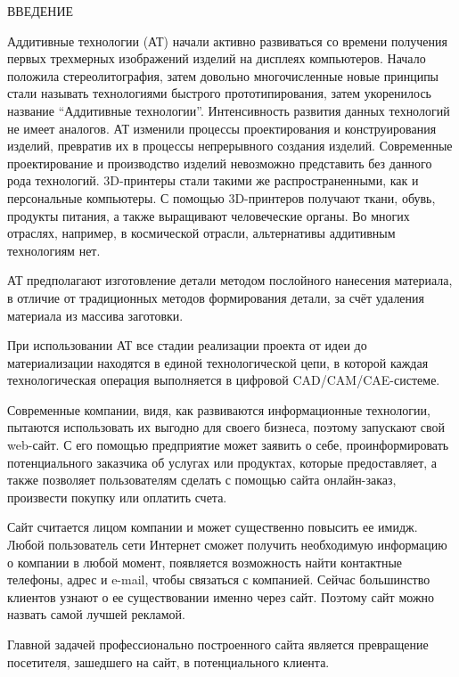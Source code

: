 \newpage
\begin{center}ВВЕДЕНИЕ\end{center}


Аддитивные технологии (АТ) начали активно развиваться со времени получения первых трехмерных изображений изделий на дисплеях компьютеров. Начало положила стереолитография, затем довольно многочисленные новые принципы стали называть технологиями быстрого прототипирования, затем укоренилось название ``Аддитивные технологии''. Интенсивность развития данных технологий не имеет аналогов. АТ изменили процессы проектирования и конструирования изделий, превратив их в процессы непрерывного создания изделий. Современные проектирование и производство изделий невозможно представить без данного рода технологий. 3D-принтеры стали такими же распространенными, как и персональные компьютеры. С помощью 3D-принтеров получают ткани, обувь, продукты питания, а также выращивают человеческие органы. Во многих отраслях, например, в космической отрасли, альтернативы аддитивным технологиям нет.

АТ предполагают изготовление детали методом послойного нанесения материала, в отличие от традиционных методов формирования детали, за счёт удаления материала из массива заготовки.

При использовании АТ все стадии реализации проекта от идеи до материализации находятся в единой технологической цепи, в которой каждая технологическая операция выполняется в цифровой CAD/CAM/CAE-системе.

Современные компании, видя, как развиваются информационные технологии, пытаются использовать их выгодно для своего бизнеса, поэтому запускают свой web-сайт. С его помощью предприятие может заявить о себе, проинформировать потенциального заказчика об услугах или продуктах, которые предоставляет, а также позволяет пользователям сделать с помощью сайта онлайн-заказ, произвести покупку или оплатить счета.

Сайт считается лицом компании и может существенно повысить ее имидж. Любой пользователь сети Интернет сможет получить необходимую информацию о компании в любой момент, появляется возможность найти контактные телефоны, адрес и e-mail, чтобы связаться с компанией. Сейчас большинство клиентов узнают о ее существовании именно через сайт. Поэтому сайт можно назвать самой лучшей рекламой. 

Главной задачей профессионально построенного сайта является превращение посетителя, зашедшего на сайт, в потенциального клиента.

